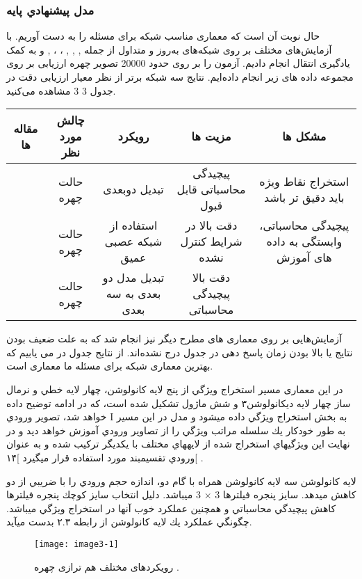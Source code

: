\subsubsection{مدل پيشنهادي پايه}
حال نوبت آن است که معماری مناسب شبکه برای مسئله را به دست آوریم. با آزمایش‌های مختلف بر روی شبکه‌های به‌روز و متداول از جمله
,
,
,
،
،
,
و
به کمک یادگیری انتقال انجام دادیم. آزمون را بر روی حدود 20000 تصویر چهره ارزیابی بر روی مجموعه داده های زیر‌ انجام داده‌ایم. نتایج سه شبکه برتر از نظر معیار‌ ارزیابی دقت در جدول ‏3 3 مشاهده می‌کنید. 
\begin{center}
\begin{tabular}{|c c c c c|}
\hline 
مقاله ها & چالش مورد نظر & رویکرد & مزیت ها & مشکل ها
\\
\hline 
 [23-26] & حالت چهره	 & تبدیل دوبعدی & 	پیچیدگی محاسباتی قابل قبول & 	استخراج نقاط ویژه باید دقیق تر باشد
 \\
\hline
[22, 27-30] & حالت چهره & 	استفاده از شبکه عصبی عمیق & دقت بالا در شرایط کنترل نشده & 	پیچیدگی محاسباتی، وابستگی به داده های آموزش 
\\
\hline
[11, 31-34] & حالت چهره & 	تبدیل مدل دو بعدی به سه بعدی & 	دقت بالا 	پیچیدگی محاسباتی
\\
\hline
\end{tabular}
\end{center}

آزمایش‌هایی بر روی معماری های مطرح دیگر نیز انجام شد که به علت ضعیف بودن نتایج یا بالا بودن زمان پاسخ دهی در جدول‌ درج نشده‌اند. از نتایج جدول‌ در می یابیم که بهترین معماری شبکه برای مسئله ما معماری  است.

در این معماری مسير استخراج ويژگي از پنج لايه كانولوشن، چهار لايه خطي و نرمال ساز چهار لايه ديكانولوشن۳ و شش ماژول  تشکیل شده است، كه در ادامه توضيح داده خواهد شد، تصوير ورودي I به بخش استخراج ويژگي داده ميشود و مدل در اين مسير به طور خودكار يك سلسله مراتب ويژگي را از تصاوير ورودي آموزش خواهد ديد و در نهايت اين ويژگيهاي استخراج شده از لايههاي مختلف با يكديگر تركيب شده و به عنوان ورودي تقسيمبند مورد استفاده قرار ميگيرد ]۱۴[ .

لايه كانولوشن
سه لايه كانولوشن همراه با گام دو، اندازه حجم ورودي را با ضريبي از دو كاهش ميدهد. سايز پنجره فيلترها 3 × 3 ميباشد. دليل انتخاب سايز كوچك پنجره فيلترها كاهش پيچيدگي محاسباتي و همچنين عملكرد خوب آنها در استخراج ويژگي ميباشد. چگونگي عملكرد يك لايه كانولوشن از رابطه ۲.۳ بدست
ميآيد.
 \begin{figure}[h]
\centering
  \texttt{[image: image3-1]}
  \caption{رویکردهای مختلف هم ترازی چهره \cite{ref1}.}
  \label{image2-1}
\end{figure}


